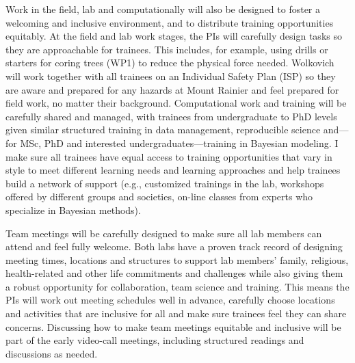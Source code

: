 \documentclass[12pt,oneside]{article}
\begin{document}
Work in the field, lab and computationally will also be designed to foster a welcoming and inclusive environment, and to distribute training opportunities equitably. At the field and lab work stages, the PIs will carefully design tasks so they are approachable for trainees. This includes, for example, using drills or starters for coring trees (WP1) to reduce the physical force needed.  Wolkovich will work together with all trainees on an Individual Safety Plan (ISP) so they are aware and prepared for any hazards at Mount Rainier and feel prepared for field work, no matter their background.  Computational work and training will be carefully shared and managed, with trainees from undergraduate to PhD levels given similar structured training in data management, reproducible science and---for MSc, PhD and interested undergraduates---training in Bayesian modeling. I make sure all trainees have equal access to training opportunities that vary in style to meet different learning needs and learning approaches and help trainees build a network of support (e.g., customized trainings in the lab, workshops offered by different groups and societies, on-line classes from experts who specialize in Bayesian methods). %

Team meetings will be carefully designed to make sure all lab members can attend and feel fully welcome. Both labs have a proven track record of designing meeting times, locations and structures to support lab members' family, religious, health-related and other life commitments and challenges while also giving them a robust opportunity for collaboration, team science and training. This means the PIs will work out meeting schedules well in advance, carefully choose locations and activities that are inclusive for all and make sure trainees feel they can share concerns. Discussing how to make team meetings equitable and inclusive  will be part of the early video-call meetings, including structured readings and discussions as needed. %
\end{document}
